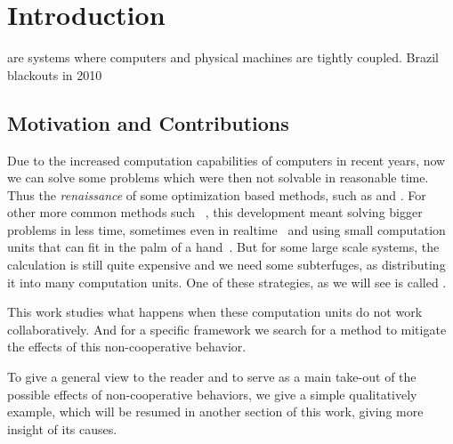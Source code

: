 \documentclass[../main.tex]{subfiles}
\begin{document}
\chapter{Introduction}\label{cha:introduction}

\cps{} are systems where computers and physical machines are tightly coupled.
%
Brazil blackouts in 2010 \cite{Conti2010}


\section{Motivation and Contributions}
Due to the increased computation capabilities of computers in recent years,
now we can solve some problems which were then not solvable in reasonable time.
Thus the \emph{renaissance} of some optimization based methods, such as  and .
For other more common methods such \mpc~\cite{GarciaEtAl1989}, this development meant solving bigger problems in less time, sometimes even in realtime~ and using small computation units that can fit in the palm of a hand~\cite{BanguraMahony2014}.
But for some large scale systems, the calculation is still quite expensive and we need some subterfuges, as distributing it into many computation units.
One of these strategies, as we will see is called \dmpc.

This work studies what happens when these computation units do not work collaboratively.
And for a specific \dmpc framework we search for a method to mitigate the effects of this non-cooperative behavior.

To give a general view to the reader and to serve as a main take-out of the possible effects of non-cooperative behaviors, we give a simple qualitatively example, which will be resumed in another section of this work, giving more insight of its causes.
\end{document}
